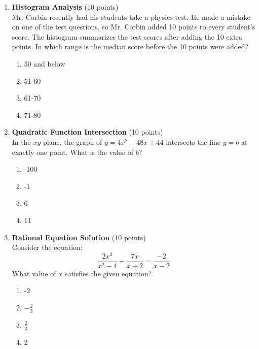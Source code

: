 \begin{enumerate}
  \item \textbf{Histogram Analysis} (10 points)\\
  Mr. Corbin recently had his students take a physics test. He made a mistake on one of the test questions, so Mr. Corbin added 10 points to every student's score. The histogram summarizes the test scores after adding the 10 extra points. In which range is the median score before the 10 points were added?
  \begin{enumerate}[label=(\Alph*)]
    \item 50 and below
    \item 51-60
    \item 61-70
    \item 71-80
  \end{enumerate}
  \begin{subanswer}
  \end{subanswer}

  \item \textbf{Quadratic Function Intersection} (10 points)\\
  In the $xy$-plane, the graph of $y=4 x^2-48 x+44$ intersects the line $y=b$ at exactly one point. What is the value of $b$?
  \begin{enumerate}[label=(\Alph*)]
    \item -100
    \item -1
    \item 6
    \item 11
  \end{enumerate}
  \begin{subanswer}
  \end{subanswer}

  \item \textbf{Rational Equation Solution} (10 points)\\
  Consider the equation:
  \[
    \frac{2 x^2}{x^2-4}+\frac{7 x}{x+2}=\frac{-2}{x-2}
  \]
  What value of $x$ satisfies the given equation?
  \begin{enumerate}[label=(\Alph*)]
    \item -2
    \item $-\frac{2}{3}$
    \item $\frac{2}{3}$
    \item 2
  \end{enumerate}
  \begin{subanswer}
  \end{subanswer}


\end{enumerate}
